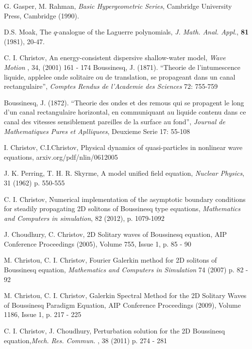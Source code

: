 \documentclass[12pt]{article}
\theoremstyle{theorem}
\theoremstyle{defi}
\begin{document}
\begin{thebibliography}{99}

 G. Gasper, M. Rahman,
{\it Basic Hypergeometric Series}, Cambridge University Press, Cambridge (1990).

 D.S. Moak,
The $q$-analogue of the Laguerre polynomials, {\it J. Math. Anal. Appl.}, {\bf 81} (1981), 20-47.

 C. I. Christov, An energy-consistent dispersive shallow-water model,  {\it Wave Motion }, 34, (2001) 161 - 174
 Boussinesq, J. (1871). “Theorie de l’intumescence liquide, applelee onde solitaire ou de translation, se propageant dans un canal rectangulaire”,  {\it Comptes Rendus de l’Academie des Sciences } 72: 755-759

 Boussinesq, J. (1872). “Theorie des ondes et des remous qui se propagent le long d’un canal rectangulaire horizontal, en communiquant au liquide contenu dans ce canal des vitesses sensiblement pareilles de la surface au fond”, {\it Journal de Mathematiques Pures et Aplliquees}, Deuxieme Serie 17: 55-108

 I. Christov, C.I.Christov, Physical dynamics of quasi-particles in nonlinear wave equations, arxiv.org/pdf/nlin/0612005

 J. K. Perring, T. H. R. Skyrme, A model unified field equation, {\it Nuclear Physics},  31 (1962) p. 550-555 

  C. I. Christov, Numerical implementation of the asymptotic boundary conditions for steadily propagating 2D solitons of Boussinesq type equations, {\it Mathematics and Computers in simulation}, 82 (2012), p. 1079-1092

  J. Choudhury, C. Christov, 2D Solitary waves of Boussinesq equation, AIP Conference Proceedings (2005), Volume 755, Issue 1, p. 85 - 90

  M. Christou, C. I. Christov, Fourier Galerkin method for 2D solitons of Boussinesq equation,  {\it Mathematics and Computers in Simulation} 74 (2007) p. 82 - 92

   M. Christou, C. I. Christov, Galerkin Spectral Method for the 2D Solitary Waves of Boussinesq Paradigm Equation, AIP Conference Proceedings (2009), Volume 1186, Issue 1, p. 217 - 225

 C. I. Christov, J. Choudhury, Perturbation solution for the 2D Boussinesq equation,{\it Mech. Res. Commun. }, 38 (2011) p. 274 - 281


\end{thebibliography}
\end{document}
